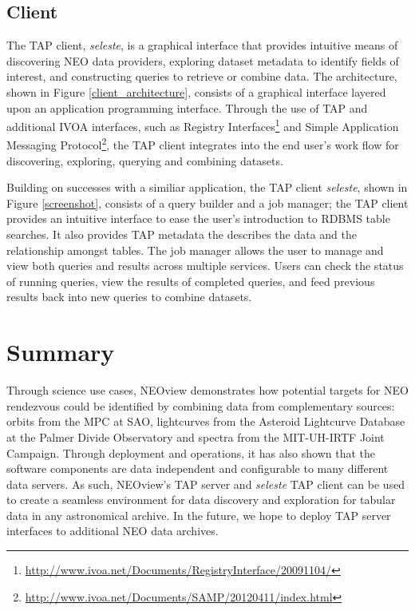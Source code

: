 
\subsection{Client}
The TAP client, \textit{seleste}, is a graphical interface that provides intuitive means of discovering NEO data providers, exploring dataset metadata to identify fields of interest, and constructing queries to retrieve or combine data.  The architecture, shown in Figure \ref{client_architecture}, consists of a graphical interface layered upon an application programming interface.  Through the use of TAP and additional IVOA interfaces, such as Registry Interfaces\footnote{\url{http://www.ivoa.net/Documents/RegistryInterface/20091104/}} and Simple Application Messaging Protocol\footnote{\url{http://www.ivoa.net/Documents/SAMP/20120411/index.html}}, the TAP client integrates into the end user's work flow for discovering, exploring, querying and combining datasets.

Building on successes with a similiar application\citep{cscview}, the TAP client \textit{seleste}, shown in Figure \ref{screenshot}, consists of a query builder and a job manager; the TAP client provides an intuitive interface to ease the user's introduction to RDBMS table searches.  It also provides TAP metadata the describes the data and the relationship amongst tables.  The job manager allows the user to manage and view both queries and results across multiple services.  Users can check the status of running queries, view the results of completed queries, and feed previous results back into new queries to combine datasets. 


\section{Summary}
Through science use cases, NEOview demonstrates how potential targets for NEO rendezvous could be identified by combining data from complementary sources: orbits from the MPC at SAO, lightcurves from the Asteroid Lightcurve Database at the Palmer Divide Observatory and spectra from the MIT-UH-IRTF Joint Campaign. Through deployment and operations, it has also shown that the software components are data independent and configurable to many different data servers. As such, NEOview's TAP server and \textit{seleste} TAP client can be used to create a seamless environment for data discovery and exploration for tabular data in any astronomical archive.  In the future, we hope to deploy TAP server interfaces to additional NEO data archives.

